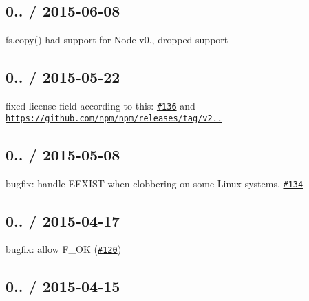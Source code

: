 \subsection*{0.. / 2015-\/06-\/08 }


\begin{DoxyItemize}
\item {\ttfamily fs.\+copy()} had support for Node v0., dropped support
\end{DoxyItemize}

\subsection*{0.. / 2015-\/05-\/22 }


\begin{DoxyItemize}
\item fixed license field according to this\+: \href{https://github.com/jprichardson/node-fs-extra/pull/136}{\tt \#136} and \href{https://github.com/npm/npm/releases/tag/v2.10.0}{\tt https\+://github.\+com/npm/npm/releases/tag/v2..}
\end{DoxyItemize}

\subsection*{0.. / 2015-\/05-\/08 }


\begin{DoxyItemize}
\item bugfix\+: handle {\ttfamily E\+E\+X\+I\+ST} when clobbering on some Linux systems. \href{https://github.com/jprichardson/node-fs-extra/pull/134}{\tt \#134}
\end{DoxyItemize}

\subsection*{0.. / 2015-\/04-\/17 }


\begin{DoxyItemize}
\item bugfix\+: allow {\ttfamily F\+\_\+\+OK} (\href{https://github.com/jprichardson/node-fs-extra/issues/120}{\tt \#120})
\end{DoxyItemize}

\subsection*{0.. / 2015-\/04-\/15 }


